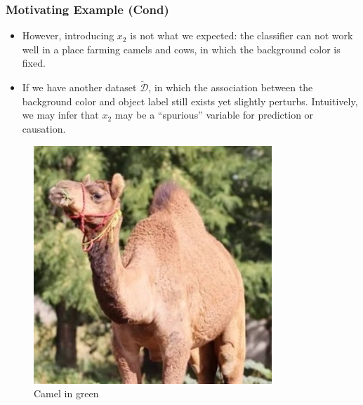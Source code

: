 \begin{frame}
  \frametitle{Motivating Example (Cond)}
  \begin{itemize}
  \item However, introducing $x_2$ is not what we expected: the classifier can not work well in a place farming camels and cows, in which the background color is fixed.
  \item If we have another dataset $\widetilde {\mathcal D}$, in which the association between the background color and object label still exists yet slightly perturbs. Intuitively, we may infer that $x_2$ may be a ``spurious'' variable for prediction or causation.
  \end{itemize}
  \vspace{6pt}
  \centering
  \begin{minipage}{.3\textwidth}
    \begin{figure}[H]
      \centering \includegraphics[width=0.8\textwidth]{figs/camel_grass}
      \caption{Camel in green}
    \end{figure}
  \end{minipage}%
  \begin{minipage}{.3\textwidth}
    \begin{figure}[H]

\end{figure}
\end{minipage}
\end{frame}
